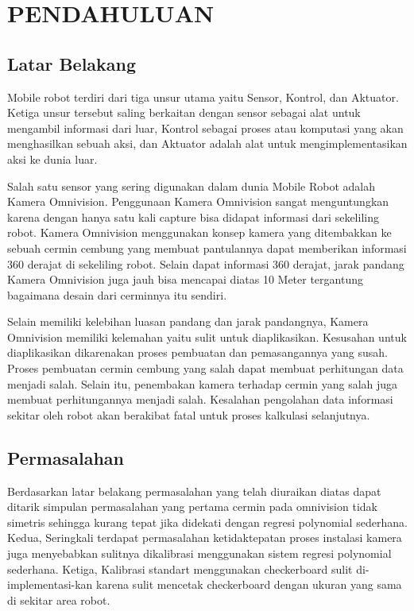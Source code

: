 \chapter{PENDAHULUAN}
\label{chap:pendahuluan}


\section{Latar Belakang}
\label{sec:latarbelakang}


Mobile robot terdiri dari tiga unsur utama yaitu Sensor, Kontrol, dan Aktuator. Ketiga unsur tersebut saling berkaitan dengan sensor sebagai alat untuk mengambil informasi dari luar, Kontrol sebagai proses atau komputasi yang akan menghasilkan sebuah aksi, dan Aktuator adalah alat untuk mengimplementasikan aksi ke dunia luar. 

Salah satu sensor yang sering digunakan dalam dunia Mobile Robot adalah Kamera Omnivision. Penggunaan Kamera Omnivision sangat menguntungkan karena dengan hanya satu kali capture bisa didapat informasi dari sekeliling robot. Kamera Omnivision menggunakan konsep kamera yang ditembakkan ke sebuah cermin cembung yang membuat pantulannya dapat memberikan informasi 360 derajat di sekeliling robot. Selain dapat informasi 360 derajat, jarak pandang Kamera Omnivision juga jauh bisa mencapai diatas 10 Meter tergantung bagaimana desain dari cerminnya itu sendiri. 

Selain memiliki kelebihan luasan pandang dan jarak pandangnya, Kamera Omnivision memiliki kelemahan yaitu sulit untuk diaplikasikan. Kesusahan untuk diaplikasikan dikarenakan proses pembuatan dan pemasangannya yang susah. Proses pembuatan cermin cembung yang salah dapat membuat perhitungan data menjadi salah. Selain itu, penembakan kamera terhadap cermin yang salah juga membuat perhitungannya menjadi salah. Kesalahan pengolahan data informasi sekitar oleh robot akan berakibat fatal untuk proses kalkulasi selanjutnya. 


\section{Permasalahan}
\label{sec:permasalahan}

Berdasarkan latar belakang permasalahan yang telah diuraikan diatas dapat ditarik simpulan permasalahan yang pertama cermin pada omnivision tidak simetris sehingga kurang tepat jika didekati dengan regresi polynomial sederhana. Kedua, Seringkali terdapat permasalahan ketidaktepatan proses instalasi kamera juga menyebabkan sulitnya dikalibrasi menggunakan sistem regresi polynomial sederhana. Ketiga, Kalibrasi standart menggunakan checkerboard sulit di-implementasi-kan karena sulit mencetak checkerboard dengan ukuran yang sama di sekitar area robot. 


